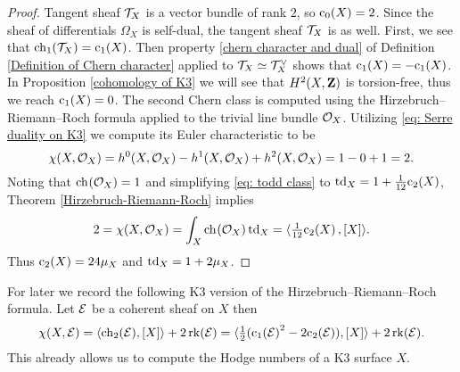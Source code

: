 \begin{proof}
    Tangent sheaf $\mathcal{T}_{X}$ is a vector bundle of rank $2$, so $\cclass[0](X) = 2$. Since the sheaf of differentials $\Omega_X$ is self-dual, the tangent sheaf $\mathcal{T}_{X}$ is as well. First, we see that $\ch[1](\tangent{X}) = \cclass[1](X)$. Then property \ref{chern character and dual} of Definition \ref{Definition of Chern character} applied to $\mathcal{T}_{X} \simeq \mathcal{T}_{X}^\vee$ shows that $\cclass[1](X) = -\cclass[1](X)$. In Proposition \ref{cohomology of K3} we will see that $H^{2}(X, \mathbf Z)$ is torsion-free, thus we reach $\cclass[1](X) = 0$. The second Chern class is computed using the Hirzebruch--Riemann--Roch formula applied to the trivial line bundle ${\mathcal{O}_{X}}$. Utilizing \eqref{eq: Serre duality on K3} we compute its Euler characteristic to be 
    \[
        \chi(X, {\mathcal{O}_{X}}) = h^0(X, {\mathcal{O}_{X}}) - h^1(X, {\mathcal{O}_{X}}) + h^2(X, {\mathcal{O}_{X}}) = 1 - 0 + 1 = 2.
    \]
    Noting that $\ch[]{\struct{X}} = 1$ and simplifying \eqref{eq: todd class} to $\td_X = 1 + \frac{1}{12}\cclass[2]{X}$, Theorem \ref{Hirzebruch-Riemann-Roch} implies
    \[
        2 = \chi(X, \struct{X}) = \int_X \ch[]{\struct{X}}\tdclass{X} = \pairing{\tfrac{1}{12}\cclass[2]{X}}{[X]}.
    \]
    Thus $\cclass[2](X) = 24 \mu_X$ and $\operatorname{td}_{X} = 1 + 2\mu_X$.
\end{proof}

For later we record the following K3 version of the Hirzebruch--Riemann--Roch formula. Let $\mathcal E$ be a coherent sheaf on $X$ then 
\begin{equation}
    \label{eq: HRR for K3}
    \chi(X, \E) = \pairing{\ch[2](\E)}{[X]} + 2\rk{\E} = \pairing{\tfrac{1}{2}(\cclass[1]{\E}^2 - 2\cclass[2]{\E})}{[X]} + 2 \rk{\E}.
\end{equation}
This already allows us to compute the Hodge numbers of a K3 surface $X$.

